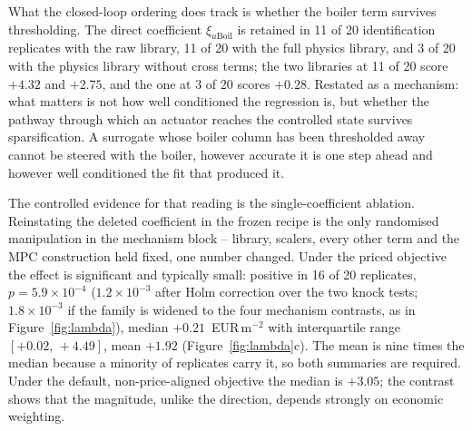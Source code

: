 What the closed-loop ordering does track is whether the boiler term survives
thresholding. The direct coefficient $\xi_{u\text{Boil}}$ is retained in 11 of 20
identification replicates with the raw library, 11 of 20 with the full physics
library, and 3 of 20 with the physics library without cross terms; the two
libraries at 11 of 20 score $+4.32$ and $+2.75$, and the one at 3 of 20 scores
$+0.28$.
Restated as a mechanism: what matters is not how well conditioned the regression
is, but whether the pathway through which an actuator reaches the controlled state
survives sparsification. A surrogate whose boiler column has been thresholded away
cannot be steered with the boiler, however accurate it is one step ahead and
however well conditioned the fit that produced it.

The controlled evidence for that reading is the single-coefficient ablation.
Reinstating the deleted
coefficient in the frozen recipe is the only randomised manipulation in the
mechanism block -- library, scalers, every other term and the MPC construction held
fixed, one number changed. Under the priced objective the effect is significant and
typically small: positive in 16 of 20 replicates, $p=5.9\times10^{-4}$
($1.2\times10^{-3}$ after Holm correction over the two knock tests; $1.8\times10^{-3}$
if the family is widened to the four mechanism contrasts, as in
Figure~\ref{fig:lambda}), median $+0.21$~EUR\,m$^{-2}$ with
interquartile range $[+0.02,\,+4.49]$, mean $+1.92$ (Figure~\ref{fig:lambda}c).
The mean is nine times the median because a minority of replicates carry it, so both
summaries are required. Under the default, non-price-aligned objective the median is
$+3.05$; the contrast shows that the magnitude, unlike the direction, depends strongly
on economic weighting.

